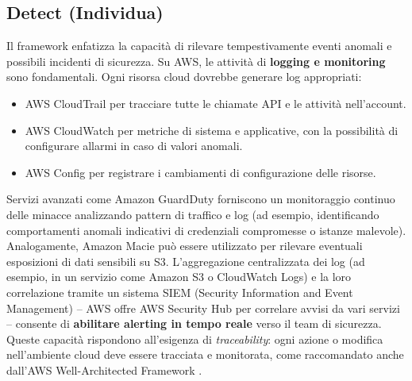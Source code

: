 \subsection{Detect (Individua)}
\label{subsec:nist_csf_detect}
Il framework enfatizza la capacità di rilevare tempestivamente eventi anomali e possibili incidenti di sicurezza. Su AWS, le attività di \textbf{logging e monitoring} sono fondamentali. Ogni risorsa cloud dovrebbe generare log appropriati:
\begin{itemize}
    \item AWS CloudTrail per tracciare tutte le chiamate API e le attività nell'account.
    \item AWS CloudWatch per metriche di sistema e applicative, con la possibilità di configurare allarmi in caso di valori anomali.
    \item AWS Config per registrare i cambiamenti di configurazione delle risorse.
\end{itemize}
Servizi avanzati come Amazon GuardDuty forniscono un monitoraggio continuo delle minacce analizzando pattern di traffico e log (ad esempio, identificando comportamenti anomali indicativi di credenziali compromesse o istanze malevole). Analogamente, Amazon Macie può essere utilizzato per rilevare eventuali esposizioni di dati sensibili su S3. L'aggregazione centralizzata dei log (ad esempio, in un servizio come Amazon S3 o CloudWatch Logs) e la loro correlazione tramite un sistema SIEM (Security Information and Event Management) – AWS offre AWS Security Hub per correlare avvisi da vari servizi – consente di \textbf{abilitare alerting in tempo reale} verso il team di sicurezza. Queste capacità rispondono all'esigenza di \textit{traceability}: ogni azione o modifica nell'ambiente cloud deve essere tracciata e monitorata, come raccomandato anche dall'AWS Well-Architected Framework \cite{awsWellArchitected}.

